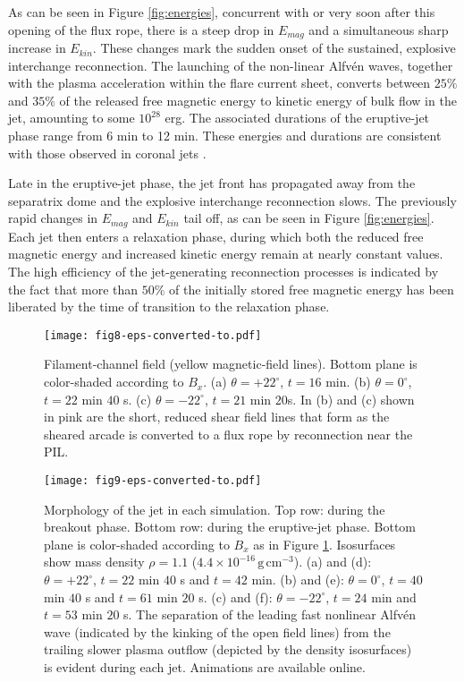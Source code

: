 \documentclass[twocolumn]{aastex6}
\begin{document}
As can be seen in Figure \ref{fig:energies}, concurrent with or very soon after this opening of the flux rope, there is a steep drop in $E_{mag}$ and a simultaneous sharp increase in $E_{kin}$. These changes mark the sudden onset of the sustained, explosive interchange reconnection. The launching of the non-linear Alfv\'{e}n waves, together with the plasma acceleration within the flare current sheet, converts between $25\%$ and $35\%$ of the released free magnetic energy to kinetic energy of bulk flow in the jet, amounting to some $10^{28}$ erg. The associated durations of the eruptive-jet phase range from 6 min to 12 min. These energies and durations are consistent with those observed in coronal jets \citep{Shibata1992,Savcheva2007}.

Late in the eruptive-jet phase, the jet front has propagated away from the separatrix dome and the explosive interchange reconnection slows. The previously rapid changes in $E_{mag}$ and $E_{kin}$ tail off, as can be seen in Figure \ref{fig:energies}. Each jet then enters a relaxation phase, during which both the reduced free magnetic energy and increased kinetic energy remain at nearly constant values. The high efficiency of the jet-generating reconnection processes is indicated by the fact that more than $50\%$ of the initially stored free magnetic energy has been liberated by the time of transition to the relaxation phase.

\begin{figure*}
\centering
\texttt{[image: fig8-eps-converted-to.pdf]}
\caption{Filament-channel field (yellow magnetic-field lines). Bottom plane is color-shaded according to $B_x$. (a) $\theta = +22^\circ$, $t = 16$ min. (b) $\theta = 0^\circ$, $t = 22$ min $40$ s. (c) $\theta = -22^\circ$, $t = 21$ min $20$s. In (b) and (c) shown in pink are the short, reduced shear field lines that form as the sheared arcade is converted to a flux rope by reconnection near the PIL.}
\label{fig:filaments}
\end{figure*}

\begin{figure*}
\centering
\texttt{[image: fig9-eps-converted-to.pdf]}
\caption{Morphology of the jet in each simulation. Top row: during the breakout phase. Bottom row: during the eruptive-jet phase. Bottom plane is color-shaded according to $B_x$ as in Figure \ref{fig:filaments}. Isosurfaces show mass density $\rho = 1.1$ ($4.4\times 10^{-16} \,\text{g}\,\text{cm}^{-3}$). (a) and (d): $\theta = +22^\circ$, $t = 22$ min $40$ s and $t = 42$ min. (b) and (e): $\theta = 0^\circ$, $t = 40$ min $40$ s and $t = 61$ min $20$ s. (c) and (f): $\theta = -22^\circ$, $t = 24$ min and $t = 53$ min $20$ s. The separation of the leading fast nonlinear Alfv\'{e}n wave (indicated by the kinking of the open field lines) from the trailing slower plasma outflow (depicted by the density isosurfaces) is evident during each jet. Animations are available online.}
\label{fig:jetiso}
\end{figure*}
\end{document}

